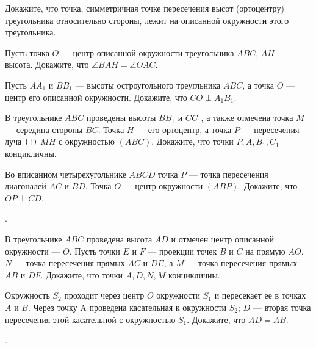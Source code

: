 \begin{tasks}
    \item Докажите, что точка, симметричная точке пересечения высот (ортоцентру) треугольника относительно стороны, лежит на описанной окружности этого треугольника.

    \item Пусть точка $O$ --- центр описанной окружности треугольника $ABC$, $AH$ --- высота. Докажите, что $\angle BAH = \angle OAC$.
        
    \item Пусть $AA_1$ и $BB_1$ --- высоты остроугольного треугльника $ABC$, а точка $O$ --- центр его описанной окружности. Докажите, что $CO \perp A_1B_1$.

    \item В треугольнике $ABC$ проведены высоты $BB_1$ и $CC_1$, а также отмечена точка $M$ --- середина стороны $BC$. Точка $H$ --- его ортоцентр, а точка $P$ --- пересечения луча \texttt{(!)} $MH$ с окружностью $(ABC)$. Докажите, что точки $P, A, B_1, C_1$  концикличны. 

    \item Во вписанном четырехугольнике $ABCD$ точка $P$ --- точка пересечения диагоналей $AC$ и $BD$. Точка $O$ --- центр окружности $(ABP)$. Докажите, что $OP \perp CD$. 

    \item {}. 

    \item В треугольнике $ABC$ проведена высота $AD$ и отмечен центр описанной окружности --- $O$. Пусть точки $E$ и $F$ --- проекции точек $B$ и $C$ на прямую $AO$. $N$ --- точка пересечения прямых $AC$ и $DE$, а $M$ --- точка пересечения прямых $AB$ и $DF$. Докажите, что точки $A, D, N, M$ концикличны.

    \item Окружность $S_2$ проходит через центр $O$ окружности $S_1$ и пересекает ее в точках $A$ и $B$. Через точку A проведена касательная к окружности $S_2$; $D$ --- вторая точка пересечения этой касательной с окружностью $S_1$. Докажите, что $AD = AB$.

    \item {}. 


\end{tasks}
